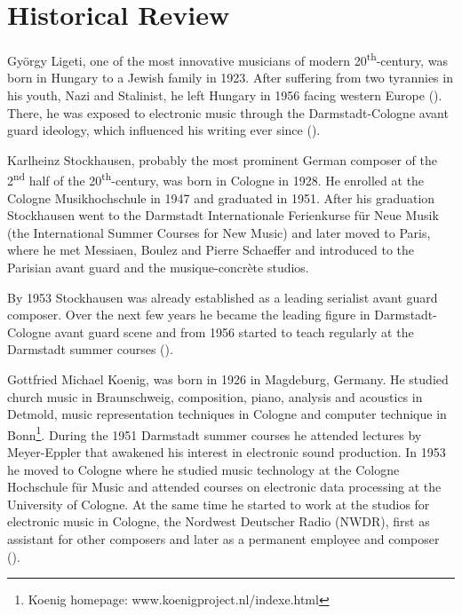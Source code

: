 \documentclass[a4paper,11pt]{article}
\begin{document}
\section{Historical Review}
\label{sec:historical_Review}

Gy{\"o}rgy Ligeti, one of the most innovative musicians of modern 20\textsuperscript{th}-century, was born in Hungary to a Jewish family in 1923.
After suffering from two tyrannies in his youth, Nazi and Stalinist, he left Hungary in 1956 facing western Europe (\cite{ligeti_grove}).
There, he was exposed to electronic music through the Darmstadt-Cologne avant guard ideology, which influenced his writing ever since (\cite{levy2006}).

Karlheinz Stockhausen, probably the most prominent German composer of the 2\textsuperscript{nd} half of the 20\textsuperscript{th}-century, was born in Cologne in 1928.
He enrolled at the Cologne Musikhochschule in 1947 and graduated in 1951.
After his graduation Stockhausen went to the Darmstadt Internationale Ferienkurse f{\"u}r Neue Musik (the International Summer Courses for New Music) and later moved to Paris, where he met Messiaen, Boulez and Pierre Schaeffer and introduced to the Parisian avant guard and the musique-concr{\`e}te studios.

By 1953 Stockhausen was already established as a leading serialist avant guard composer.
Over the next few years he became the leading figure in Darmstadt-Cologne avant guard scene and from 1956 started to teach regularly at the Darmstadt summer courses (\cite{stockhausen_grove}).

Gottfried Michael Koenig, was born in 1926 in Magdeburg, Germany.
He studied church music in Braunschweig, composition, piano, analysis and acoustics in Detmold, music representation techniques in Cologne and computer technique in Bonn\footnote{Koenig homepage: www.koenigproject.nl/indexe.html}.
During the 1951 Darmstadt summer courses he attended lectures by Meyer-Eppler that awakened his interest in electronic sound production.
In 1953 he moved to Cologne where he studied music technology at the Cologne Hochschule f{\"u}r Music and attended courses on electronic data processing at the University of Cologne.
At the same time he started to work at the studios for electronic music in Cologne, the Nordwest Deutscher Radio (NWDR), first as assistant for other composers and later as a permanent employee and composer (\cite{koenig_grove}).
\end{document}
